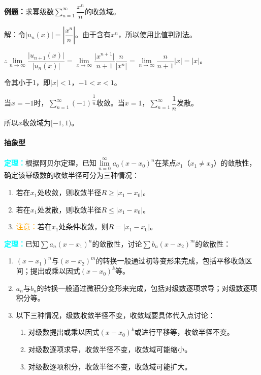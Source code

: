 \documentclass[UTF8, 12pt]{ctexart}
\begin{document}
\textbf{例题：}求幂级数$\sum\limits_{n=1}^\infty\dfrac{x^n}{n}$的收敛域。

解：令$\vert u_n(x)\vert=\left\vert\dfrac{x^n}{n}\right\vert$。由于含有$x^n$，所以使用比值判别法。

$\therefore\lim\limits_{n\to\infty}\dfrac{\vert u_{n+1}(x)\vert}{\vert u_n(x)\vert}=\lim\limits_{x\to\infty}\dfrac{\vert x^{n+1}\vert}{n+1}\dfrac{n}{\vert x^n\vert}=\lim\limits_{n\to\infty}\dfrac{n}{n+1}\vert x\vert=\vert x\vert$。\medskip

令其小于1，即$\vert x\vert<1$，$-1<x<1$。

当$x=-1$时，$\sum\limits_{n=1}^\infty(-1)^\dfrac{1}{n}$收敛。当$x=1$，$\sum\limits_{n=1}^\infty\dfrac{1}{n}$发散。

所以$x$收敛域为$[-1,1)$。

\paragraph{抽象型} \leavevmode \medskip

\textcolor{aqua}{\textbf{定理：}}根据阿贝尔定理，已知$\lim\limits_{n=0}^\infty a_0(x-x_0)^n$在某点$x_1$（$x_1\neq x_0$）的敛散性，确定该幂级数的收敛半径可分为三种情况：

\begin{enumerate}
    \item 若在$x_1$处收敛，则收敛半径$R\geqslant\vert x_1-x_0\vert$。
    \item 若在$x_1$处发散，则收敛半径$R\leqslant\vert x_1-x_0\vert$。
    \item \textcolor{orange}{注意：}若在$x_1$处条件收敛，则$R=\vert x_1-x_0\vert$。
\end{enumerate}

\textcolor{aqua}{\textbf{定理：}}已知$\sum a_n(x-x_1)^n$的敛散性，讨论$\sum b_n(x-x_2)^m$的敛散性：

\begin{enumerate}
    \item $(x-x_1)^n$与$(x-x_2)^m$的转换一般通过初等变形来完成，包括平移收敛区间；提出或乘以因式$(x-x_0)^k$等。
    \item $a_n$与$b_n$的转换一般通过微积分变形来完成，包括对级数逐项求导；对级数逐项积分等。
    \item 以下三种情况，级数收敛半径不变，收敛域要具体代入点讨论：\begin{enumerate}
        \item 对级数提出或乘以因式$(x-x_0)^k$或进行平移等，收敛半径不变。
        \item 对级数逐项求导，收敛半径不变，收敛域可能缩小。
        \item 对级数逐项积分，收敛半径不变，收敛域可能扩大。
    \end{enumerate}
\end{enumerate}
\end{document}

